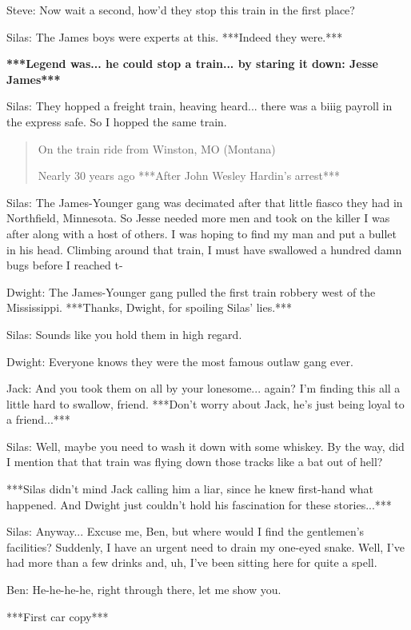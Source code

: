 \documentclass{article}
\begin{document}
Steve: Now wait a second, how'd they stop this train in the first place?

Silas: The James boys were experts at this. ***Indeed they were.***

\textbf{***Legend was... he could stop a train... by staring it down: Jesse James***}

Silas: They hopped a freight train, heaving heard... there was a biiig payroll in the express safe. So I hopped the same train.

\begin{quote}
    On the train ride from Winston, MO (Montana)
    
    Nearly 30 years ago ***After John Wesley Hardin's arrest***
\end{quote}

Silas: The James-Younger gang was decimated after that little fiasco they had in Northfield, Minnesota. So Jesse needed more men and took on the killer I was after along with a host of others. I was hoping to find my man and put a bullet in his head. Climbing around that train, I must have swallowed a hundred damn bugs before I reached t-

Dwight: The James-Younger gang pulled the first train robbery west of the Mississippi. ***Thanks, Dwight, for spoiling Silas' lies.***

Silas: Sounds like you hold them in high regard.

Dwight: Everyone knows they were the most famous outlaw gang ever.

Jack: And you took them on all by your lonesome... again? I'm finding this all a little hard to swallow, friend. ***Don't worry about Jack, he's just being loyal to a friend...***

Silas: Well, maybe you need to wash it down with some whiskey. By the way, did I mention that that train was flying down those tracks like a bat out of hell?

***Silas didn’t mind Jack calling him a liar, since he knew first-hand what happened. And Dwight just couldn't hold his fascination for these stories...***

Silas: Anyway... Excuse me, Ben, but where would I find the gentlemen's facilities? Suddenly, I have an urgent need to drain my one-eyed snake. Well, I've had more than a few drinks and, uh, I've been sitting here for quite a spell.

Ben: He-he-he-he, right through there, let me show you.

***First car copy***
\end{document}
